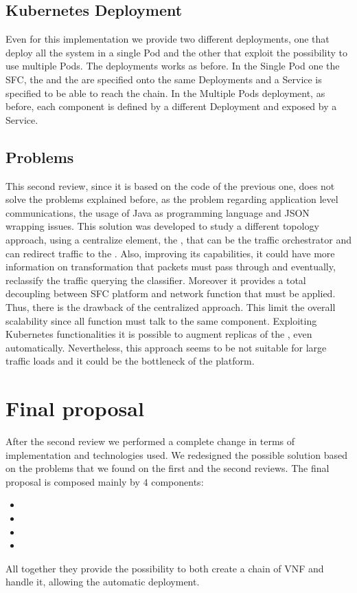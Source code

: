 \subsection{Kubernetes Deployment}
Even for this implementation we provide two different deployments, one that
deploy all the system in a single Pod and the other that exploit the possibility
to use multiple Pods. The deployments works as before. In the Single Pod one the
SFC, the \enchainer{} and the \dispatcher{} are specified onto the same
Deployments and a Service is specified to be able to reach the chain. In the
Multiple Pods deployment, as before, each component is defined by a different
Deployment and exposed by a Service.

\subsection{Problems}
This second review, since it is based on the code of the previous one, does not
solve the problems explained before, as the problem regarding application
level communications, the usage of Java as programming language and JSON
wrapping issues. This solution was developed to study a different topology
approach, using a centralize element, the \dispatcher{}, that can be the traffic
orchestrator and can redirect traffic to the \vnfs{}. Also, improving its
capabilities, it could have more information on transformation that packets must
pass through and eventually, reclassify the traffic querying the classifier.
Moreover it provides a total decoupling between SFC platform and network
function that must be applied. Thus, there is the drawback of the centralized
approach. This limit the overall scalability since all function must talk to the
same component. Exploiting Kubernetes functionalities it is possible to augment
replicas of the \dispatcher{}, even automatically. Nevertheless, this approach
seems to be not suitable for large traffic loads and it could be the bottleneck
of the platform.

\section{Final proposal}
After the second review we performed a complete change in terms of
implementation and technologies used. We redesigned the possible solution based
on the problems that we found on the first and the second reviews. The final
proposal is composed mainly by $4$ components:
\begin{itemize}
  \item \astaire{}
  \item \harbor{}
  \item \ironhide{}
  \item \roulette{}
\end{itemize}
All together they provide the possibility to both create a chain of VNF and
handle it, allowing the automatic deployment.

